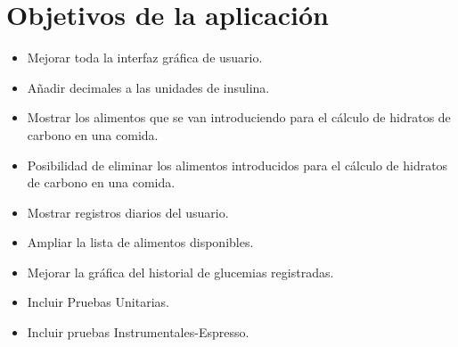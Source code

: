 \section{ Objetivos de la aplicación}
	\begin{itemize}
		\item Mejorar toda la interfaz gráfica de usuario.
		\item Añadir decimales a las unidades de insulina.
		\item Mostrar los alimentos que se van introduciendo para el cálculo de hidratos de carbono en una comida.
		\item Posibilidad de eliminar los alimentos introducidos para el cálculo de hidratos de carbono en una comida. 
		\item Mostrar registros diarios del usuario.		
		\item Ampliar la lista de alimentos disponibles.
		\item Mejorar la gráfica del historial de glucemias registradas.
		\item Incluir Pruebas Unitarias.
		\item Incluir pruebas Instrumentales-Espresso.
	\end{itemize}